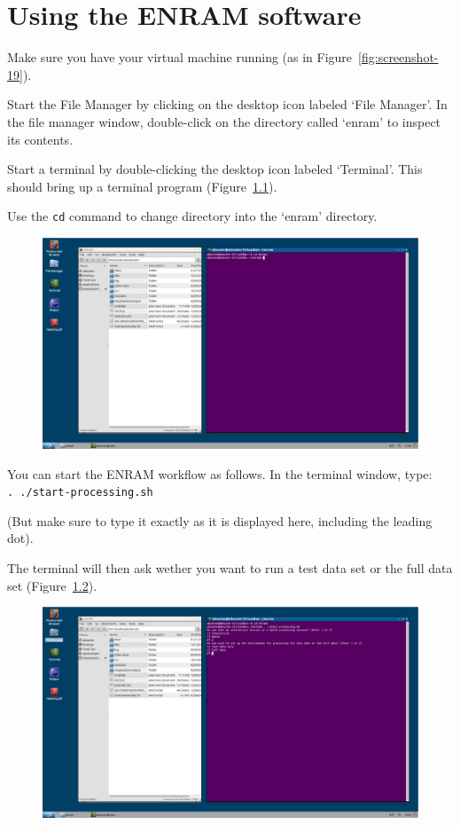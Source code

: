 \chapter{Using the ENRAM software}

Make sure you have your virtual machine running (as in Figure~\ref{fig:screenshot-19}). 

Start the File Manager by clicking on the desktop icon labeled `File Manager'. In the file manager window, double-click on the directory called `enram' to inspect its contents.

Start a terminal by double-clicking the desktop icon labeled `Terminal'. This should bring up a terminal program (Figure~\ref{fig:screenshot-24}).

Use the \texttt{cd} command to change directory into the `enram' directory.

\begin{figure}[ht]
  \centering
    \includegraphics[width=0.85\linewidth , keepaspectratio]{./../eps/screenshot-24.eps}
  \caption{}
  \label{fig:screenshot-24}
\end{figure}
\clearpage

You can start the ENRAM workflow as follows. In the terminal window, type:\\
\texttt{. ./start-processing.sh}

(But make sure to type it exactly as it is displayed here, including the leading dot).

The terminal will then ask wether you want to run a test data set or the full data set (Figure~\ref{fig:screenshot-25}).

\begin{figure}[ht]
  \centering
    \includegraphics[width=0.85\linewidth , keepaspectratio]{./../eps/screenshot-25.eps}
  \caption{}
  \label{fig:screenshot-25}
\end{figure}


